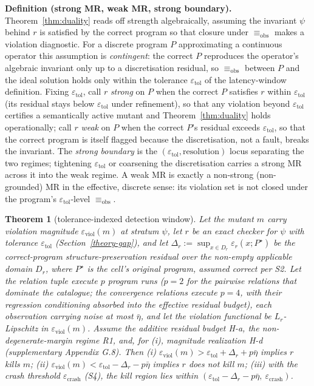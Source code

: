 \documentclass[review,12pt,authoryear]{elsarticle}
\newtheorem{theorem}{Theorem}
\begin{document}
\textbf{Definition (strong MR, weak MR, strong boundary).} Theorem~\ref{thm:duality}
reads off strength algebraically, assuming the invariant $\psi$ behind
$r$ is satisfied by the correct program so that closure under
$\equiv_{\mathrm{obs}}$ makes a violation diagnostic. For a discrete program $P$
approximating a continuous operator this assumption is \emph{contingent}:
the correct $P$ reproduces the operator's algebraic invariant only up to
a discretisation residual, so $\equiv_{\mathrm{obs}}$ between $P$ and the ideal
solution holds only within the tolerance $\varepsilon_{\mathrm{tol}}$ of
the latency-window definition. Fixing $\varepsilon_{\mathrm{tol}}$, call
$r$ \emph{strong} on $P$ when the correct $P$ satisfies $r$ within
$\varepsilon_{\mathrm{tol}}$ (its residual stays below
$\varepsilon_{\mathrm{tol}}$ under refinement), so that any violation
beyond $\varepsilon_{\mathrm{tol}}$ certifies a semantically active
mutant and Theorem~\ref{thm:duality} holds operationally; call $r$ \emph{weak} on $P$
when the correct $P$'s residual exceeds $\varepsilon_{\mathrm{tol}}$, so
that the correct program is itself flagged because the discretisation,
not a fault, breaks the invariant. The \emph{strong boundary} is the
$(\varepsilon_{\mathrm{tol}}, \text{resolution})$ locus separating the
two regimes; tightening $\varepsilon_{\mathrm{tol}}$ or coarsening the
discretisation carries a strong MR across it into the weak regime. A weak
MR is exactly a non-strong (non-grounded) MR in the effective, discrete
sense: its violation set is not closed under the program's
$\varepsilon_{\mathrm{tol}}$-level $\equiv_{\mathrm{obs}}$.

\begin{theorem}[tolerance-indexed detection window]\label{thm:window}
Let the mutant $m$ carry violation magnitude
$\varepsilon_{\mathrm{viol}}(m)$ at stratum $\psi$, let $r$ be an exact
checker for $\psi$ with tolerance $\varepsilon_{\mathrm{tol}}$
(Section~\ref{theory-gap}), and let
$\Delta_r := \sup_{x \in D_r} \varepsilon_r(x; P^\star)$ be the
correct-program structure-preservation residual over the non-empty
applicable domain $D_r$, where $P^\star$ is the cell's original program,
assumed correct per S2. Let the relation tuple execute $p$ program runs
($p = 2$ for the pairwise relations that dominate the catalogue; the
convergence relations execute $p = 4$, with their regression
conditioning absorbed into the effective residual budget), each observation carrying noise
at most $\bar\eta$, and let the violation functional be
$L_r$-Lipschitz in $\varepsilon_{\mathrm{viol}}(m)$. Assume the additive
residual budget H-a, the non-degenerate-margin regime R1, and, for (i),
magnitude realization H-d (supplementary Appendix G.8). Then
(i) $\varepsilon_{\mathrm{viol}}(m) > \varepsilon_{\mathrm{tol}} + \Delta_r + p\bar\eta$
implies $r$ kills $m$;
(ii) $\varepsilon_{\mathrm{viol}}(m) < \varepsilon_{\mathrm{tol}} - \Delta_r - p\bar\eta$
implies $r$ does not kill $m$; (iii) with the crash threshold
$\varepsilon_{\mathrm{crash}}$ (S4), the kill region lies within
$(\varepsilon_{\mathrm{tol}} - \Delta_r - p\bar\eta,\ \varepsilon_{\mathrm{crash}})$.
\end{theorem}
\end{document}
